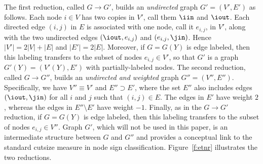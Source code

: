 The first reduction, called $G \rightarrow G'$, builds an {\em undirected} graph $G' = (V',E')$ as follows. Each node $i \in V$ has two copies in $V'$, call them $\iin$ and $\iout$. Each directed edge $(i,j)$ in $E$ is associated with one node, call it $e_{i,j}$, in $V'$, along with the two undirected edges $(\iout,e_{i,j})$ and  $(e_{i,j},\jin)$. Hence $|V'| = 2|V|+|E|$ and $|E'| = 2|E|$. Moreover, if $G = G(Y)$ is edge labeled, then this labeling transfers to the subset of nodes $e_{i,j} \in V'$, so that $G'$ is a graph $G'(Y) = (V'(Y),E')$ with partially-labeled nodes. 
The second reduction, called $G \rightarrow G''$, builds an {\em undirected and weighted} graph $G'' = (V'',E'')$.
Specifically, we have $V'' \equiv V'$ and $E'' \supset E'$, where the set $E''$ also includes edges $(\iout,\jin)$ for all $i$ and $j$ such that $(i,j) \in E$.
The edges in $E'$ have weight $2$, whereas the edges in $E''\setminus E'$ have weight $-1$.
Finally, as in the $G \rightarrow G'$ reduction, if $G = G(Y)$ is edge labeled, then this labeling transfers to the subset of nodes $e_{i,j} \in V''$. Graph $G'$, which will not be used in this paper, is an intermediate structure between $G$ and $G''$ and provides a conceptual link to the standard cutsize measure in node sign classification.
Figure~\ref{f:etnr} illustrates the two reductions. 


%

